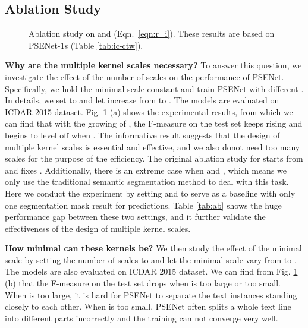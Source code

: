 \documentclass{article}
\begin{document}
\subsection{Ablation Study}

\begin{figure}[t]
  \centering
  \setlength{\fboxrule}{0pt}
  \vspace{-8pt}
  \caption{Ablation study on  and  (Eqn.~\eqref{eqn:r_i}). These results are based on PSENet-1s (Table \ref{tab:ic-ctw}).}
  \label{fig:abs}
\end{figure}

\textbf{Why are the multiple kernel scales necessary?} To answer this question, we investigate the effect of the number of scales  on the performance of PSENet. Specifically, we hold the minimal scale  constant and train PSENet with different . In details, we set  to  and let  increase from  to . The models are evaluated on ICDAR 2015 dataset. Fig. \ref{fig:abs} (a) shows the experimental results, from which we can find that with the growing of , the F-measure on the test set keeps rising and begins to level off when . The informative result suggests that the design of multiple kernel scales is essential and effective, and we also donot need too many scales for the purpose of the efficiency. The original ablation study for  starts from  and fixes . Additionally, there is an extreme case when  and , which means we only use the traditional semantic segmentation method to deal with this task. Here we conduct the experiment by setting  and  to serve as a baseline with only one segmentation mask result for predictions. Table \ref{tab:ab} shows the huge performance gap between these two settings, and it further validate the effectiveness of the design of multiple kernel scales.

\textbf{How minimal can these kernels be?} We then study the effect of the minimal scale  by setting the number of scales  to  and let the minimal scale  vary from  to . The models are also evaluated on ICDAR 2015 dataset. We can find from Fig. \ref{fig:abs} (b) that the F-measure on the test set drops when  is too large or too small. When  is too large, it is hard for PSENet to separate the text instances standing closely to each other. When  is too small, PSENet often splits a whole text line into different parts incorrectly and the training can not converge very well. 
\end{document}
